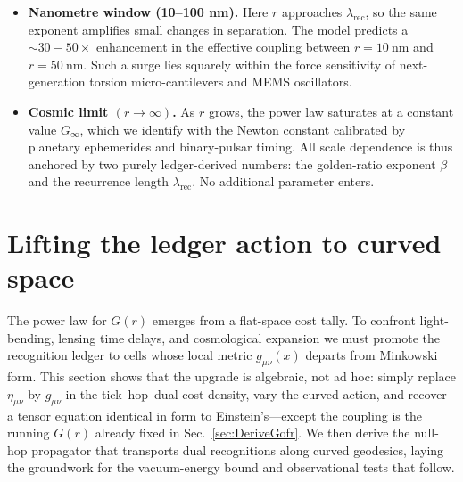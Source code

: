 \documentclass[11pt,oneside]{book}
\begin{document}
{\begin{itemize}
   \item \textbf{Nanometre window (10–100 nm).}  
         Here \(r\) approaches \(\lambda_{\text{rec}}\), so the same
         exponent amplifies small changes in separation.  The model
         predicts a \(\sim30\!-\!50\times\) enhancement in the effective
         coupling between \(r=10~\mathrm{nm}\) and
         \(r=50~\mathrm{nm}\).  Such a surge lies squarely within the
         force sensitivity of next-generation torsion micro-cantilevers
         and MEMS oscillators.

   \item \textbf{Cosmic limit \((r\to\infty)\).}  
         As \(r\) grows, the power law saturates at a constant value
         \(G_{\infty}\), which we identify with the Newton constant
         calibrated by planetary ephemerides and binary-pulsar timing.
         All scale dependence is thus anchored by two purely
         ledger-derived numbers: the golden-ratio exponent \(\beta\) and
         the recurrence length \(\lambda_{\text{rec}}\).  No additional
         parameter enters.
\end{itemize}

\section{Lifting the ledger action to curved space}

The power law for \(G(r)\) emerges from a flat-space cost tally.  
To confront light-bending, lensing time delays, and cosmological
expansion we must promote the recognition ledger to cells whose local
metric \(g_{\mu\nu}(x)\) departs from Minkowski form.  
This section shows that the upgrade is algebraic, not ad hoc:
simply replace \(\eta_{\mu\nu}\) by \(g_{\mu\nu}\) in the
tick–hop–dual cost density, vary the curved action, and recover a
tensor equation identical in form to Einstein’s—except the coupling is
the running \(G(r)\) already fixed in Sec.~\ref{sec:DeriveGofr}.  
We then derive the null-hop propagator that transports dual
recognitions along curved geodesics, laying the groundwork for the
vacuum-energy bound and observational tests that follow.
}
\end{document}
